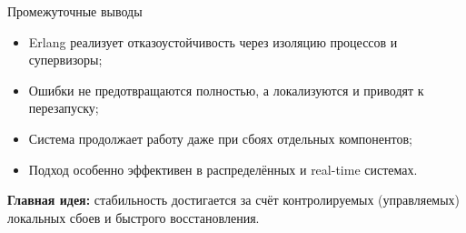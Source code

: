 \begin{frame}{Промежуточные выводы}
	\begin{itemize}
		\item Erlang реализует отказоустойчивость через изоляцию процессов и супервизоры;
		\item Ошибки не предотвращаются полностью, а локализуются и приводят к перезапуску;
		\item Система продолжает работу даже при сбоях отдельных компонентов;
		\item Подход особенно эффективен в распределённых и real-time системах.
	\end{itemize}
	\vspace{0.8em}
	\textbf{Главная идея:} стабильность достигается за счёт контролируемых (управляемых) локальных сбоев и быстрого восстановления.
\end{frame}
